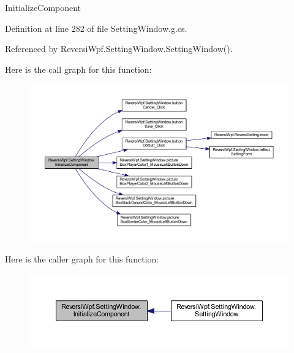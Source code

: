 Initialize\+Component 



Definition at line 282 of file Setting\+Window.\+g.\+cs.



Referenced by Reversi\+Wpf.\+Setting\+Window.\+Setting\+Window().

Here is the call graph for this function\+:
\nopagebreak
\begin{figure}[H]
\begin{center}
\leavevmode
\includegraphics[width=350pt]{class_reversi_wpf_1_1_setting_window_a34db1776e5f52338539888d97f317a5a_cgraph}
\end{center}
\end{figure}
Here is the caller graph for this function\+:
\nopagebreak
\begin{figure}[H]
\begin{center}
\leavevmode
\includegraphics[width=350pt]{class_reversi_wpf_1_1_setting_window_a34db1776e5f52338539888d97f317a5a_icgraph}
\end{center}
\end{figure}
\mbox{\label{class_reversi_wpf_1_1_setting_window_a34db1776e5f52338539888d97f317a5a}} 
